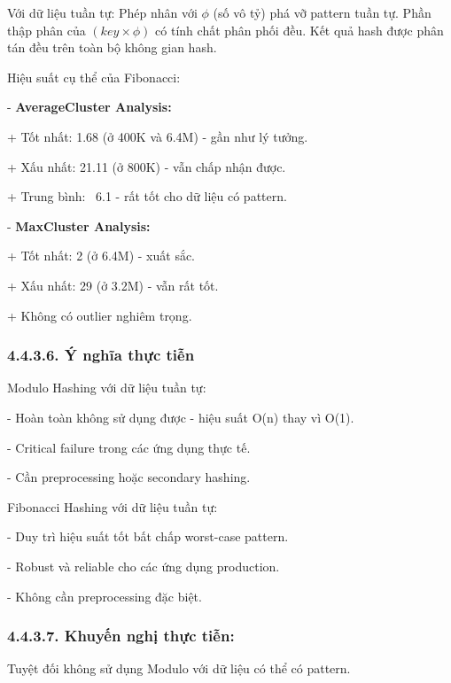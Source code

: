 \documentclass[12pt,a4paper]{report}
\begin{document}
Với dữ liệu tuần tự: Phép nhân với $\phi$ (số vô tỷ) phá vỡ pattern tuần tự. Phần thập phân của $(key \times \phi)$ có tính chất phân phối đều. Kết quả hash được phân tán đều trên toàn bộ không gian hash.

Hiệu suất cụ thể của Fibonacci:

- \textbf{AverageCluster Analysis:}

    \hspace{0.5cm}+ Tốt nhất: 1.68 (ở 400K và 6.4M) - gần như lý tưởng.
    
    \hspace{0.5cm}+ Xấu nhất: 21.11 (ở 800K) - vẫn chấp nhận được.
    
    \hspace{0.5cm}+ Trung bình: ~6.1 - rất tốt cho dữ liệu có pattern.

- \textbf{MaxCluster Analysis:}

    \hspace{0.5cm}+ Tốt nhất: 2 (ở 6.4M) - xuất sắc.
    
    \hspace{0.5cm}+ Xấu nhất: 29 (ở 3.2M) - vẫn rất tốt.
    
    \hspace{0.5cm}+ Không có outlier nghiêm trọng.

\subsubsection*{4.4.3.6. Ý nghĩa thực tiễn}

\noindent \indent Modulo Hashing với dữ liệu tuần tự:

    - Hoàn toàn không sử dụng được - hiệu suất O(n) thay vì O(1).
    
    - Critical failure trong các ứng dụng thực tế.
    
    - Cần preprocessing hoặc secondary hashing.

Fibonacci Hashing với dữ liệu tuần tự:

    - Duy trì hiệu suất tốt bất chấp worst-case pattern.
    
    - Robust và reliable cho các ứng dụng production.
    
    - Không cần preprocessing đặc biệt.

\subsubsection*{4.4.3.7. Khuyến nghị thực tiễn:}
     \noindent \indent Tuyệt đối không sử dụng Modulo với dữ liệu có thể có pattern.
     
\end{document}
